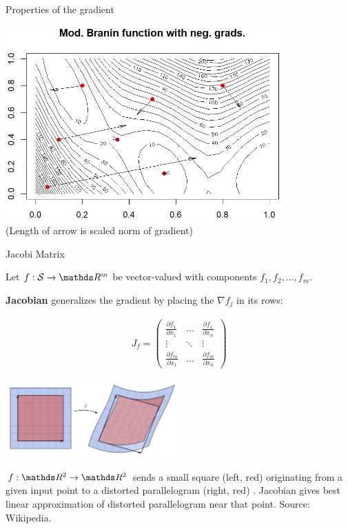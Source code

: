\documentclass[11pt,compress,t,notes=noshow, xcolor=table]{beamer}
\begin{document}
\begin{vbframe}{Properties of the gradient}
\begin{center}
\includegraphics[width=0.8\textwidth]{figure_man/branin.jpg}
\\

(Length of arrow is scaled norm of gradient)

\end{center}



\end{vbframe}




\begin{vbframe}{Jacobi Matrix}

Let $f: \mathcal{S} \to \R^m$ be vector-valued with components $f_1, f_2, ..., f_m$. 

\textbf{Jacobian} generalizes the gradient by placing the $\nabla f_j$ in its rows:

\begin{eqnarray*}
	J_f = \begin{pmatrix} \frac{\partial f_1}{\partial x_1} & \hdots & \frac{\partial f_1}{\partial x_n} \\
	\vdots & \ddots & \vdots \\
	\frac{\partial f_m}{\partial x_1} & \hdots & \frac{\partial f_m}{\partial x_n}
	\end{pmatrix}
\end{eqnarray*}

\begin{center}
	\includegraphics[width = 0.5\textwidth]{figure_man/Jacobian.png} \\
	\begin{footnotesize}
	$f: \R^2 \to \R^2$ sends  a small square (left, red) originating from a given input point to a distorted parallelogram (right, red) . Jacobian gives best linear approximation of distorted parallelogram near that point. Source: Wikipedia.
	\end{footnotesize}
\end{center}


\end{vbframe}
\end{document}
